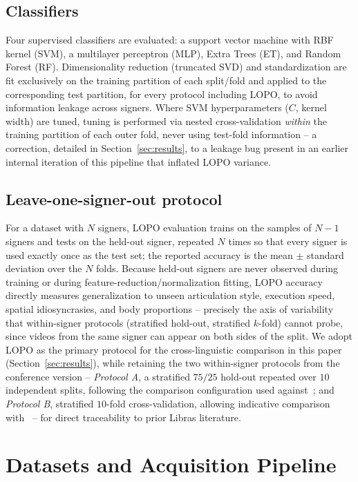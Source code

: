 \documentclass[journal]{IEEEtran}
\begin{document}
\subsection{Classifiers}
Four supervised classifiers are evaluated: a support vector machine with RBF kernel (SVM), a multilayer perceptron (MLP), Extra Trees (ET), and Random Forest (RF). Dimensionality reduction (truncated SVD) and standardization are fit exclusively on the training partition of each split/fold and applied to the corresponding test partition, for every protocol including LOPO, to avoid information leakage across signers. Where SVM hyperparameters ($C$, kernel width) are tuned, tuning is performed via nested cross-validation \emph{within} the training partition of each outer fold, never using test-fold information -- a correction, detailed in Section~\ref{sec:results}, to a leakage bug present in an earlier internal iteration of this pipeline that inflated LOPO variance.

\subsection{Leave-one-signer-out protocol}
\label{sec:lopo}
For a dataset with $N$ signers, LOPO evaluation trains on the samples of $N-1$ signers and tests on the held-out signer, repeated $N$ times so that every signer is used exactly once as the test set; the reported accuracy is the mean $\pm$ standard deviation over the $N$ folds. Because held-out signers are never observed during training or during feature-reduction/normalization fitting, LOPO accuracy directly measures generalization to unseen articulation style, execution speed, spatial idiosyncrasies, and body proportions -- precisely the axis of variability that within-signer protocols (stratified hold-out, stratified $k$-fold) cannot probe, since videos from the same signer can appear on both sides of the split. We adopt LOPO as the primary protocol for the cross-linguistic comparison in this paper (Section~\ref{sec:results}), while retaining the two within-signer protocols from the conference version -- \emph{Protocol A}, a stratified $75/25$ hold-out repeated over $10$ independent splits, following the comparison configuration used against~\cite{passos2021}; and \emph{Protocol B}, stratified $10$-fold cross-validation, allowing indicative comparison with~\cite{rego2025} -- for direct traceability to prior Libras literature.

\section{Datasets and Acquisition Pipeline}
\label{sec:datasets}
\end{document}
